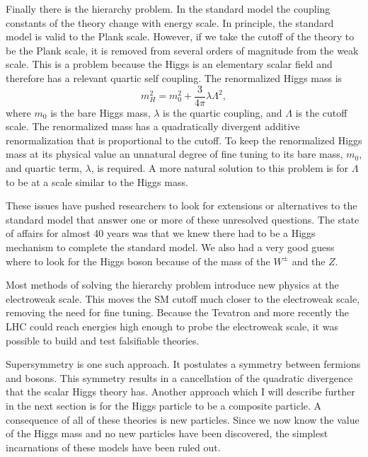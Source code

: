 Finally there is the hierarchy problem.
In the standard model the coupling constants of the theory change with energy scale.
In principle, the standard model is valid to the Plank scale.
However, if we take the cutoff of the theory to be the Plank scale, it is removed from several orders of magnitude from the weak scale.
This is a problem because the Higgs is an elementary scalar field and therefore has a relevant quartic self coupling.
The renormalized Higgs mass is
\begin{equation}
  m^2_H=m_0^2+\frac{3}{4\pi}\lambda\Lambda^2,
\end{equation}
where $m_0$ is the bare Higgs mass, $\lambda$ is the quartic coupling, and $\Lambda$ is the cutoff scale.
The renormalized mass has a quadratically divergent additive renormalization that is proportional to the cutoff.
To keep the renormalized Higgs mass at its physical value an unnatural degree of fine tuning to its bare mass, $m_0$, and quartic term, $\lambda$, is required.
A more natural solution to this problem is for $\Lambda$ to be at a scale similar to the Higgs mass.

These issues have pushed researchers to look for extensions or alternatives to the standard model that answer one or more of these unresolved questions.
The state of affairs for almost 40 years was that we knew there had to be a Higgs mechanism to complete the standard model.
We also had a very good guess where to look for the Higgs boson because of the mass of the $W^{\pm}$ and the $Z$.

Most methods of solving the hierarchy problem introduce new physics at the electroweak scale.
This moves the SM cutoff much closer to the electroweak scale, removing the need for fine tuning.
Because the Tevatron and more recently the LHC could reach energies high enough to probe the electroweak scale, it was possible to build and test falsifiable theories.

Supersymmetry is one such approach.
It postulates a symmetry between fermions and bosons.
This symmetry results in a cancellation of the quadratic divergence that the scalar Higgs theory has.
Another approach which I will describe further in the next section is for the Higgs particle to be a composite particle.
A consequence of all of these theories is new particles.
Since we now know the value of the Higgs mass and no new particles have been discovered, the simplest incarnations of these models have been ruled out.
